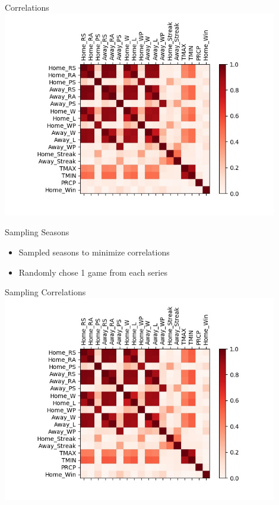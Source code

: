 \documentclass{beamer}
\begin{document}
\begin{frame}{Correlations}
    \includegraphics[width=0.9\textwidth]{full-season/combined-stats-corr-mat.jpg}
\end{frame}

\begin{frame}{Sampling Seasons}
    \begin{itemize}
        \item Sampled seasons to minimize correlations
        \item Randomly chose 1 game from each series
    \end{itemize}
\end{frame}

\begin{frame}{Sampling Correlations}
    \includegraphics[width=0.9\textwidth]{sampled-season/combined-stats-corr-mat.jpg}
\end{frame}
\end{document}
